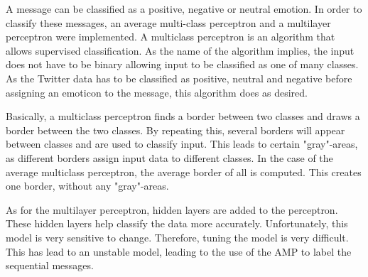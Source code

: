 
A message can be classified as a positive, negative or neutral emotion. In order to classify these messages, an average multi-class perceptron and a multilayer perceptron were implemented. A multiclass perceptron is an algorithm that allows supervised classification. As the name of the algorithm implies, the input does not have to be binary allowing input to be classified as one of many classes. As the Twitter data has to be classified as positive, neutral and negative before assigning an emoticon to the message, this algorithm does as desired. 

Basically, a multiclass perceptron finds a border between two classes and draws a border between the two classes. By repeating this, several borders will appear between classes and are used to classify input. This leads to certain "gray"-areas, as different borders assign input data to different classes. In the case of the average multiclass perceptron, the average border of all is computed. This creates one border, without any "gray"-areas.

As for the multilayer perceptron, hidden layers are added to the perceptron. These hidden layers help classify the data more accurately. Unfortunately, this model is very sensitive to change. Therefore, tuning the model is very difficult. This has lead to an unstable model, leading to the use of the AMP to label the sequential messages.